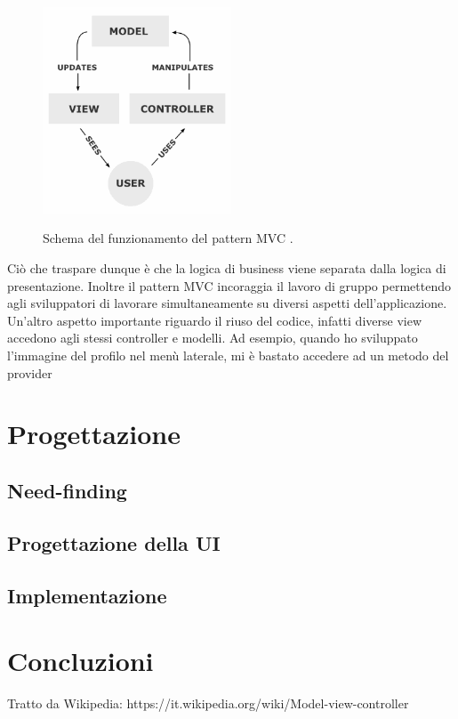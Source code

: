\documentclass[Lau, oneside]{sapthesis}%
\begin{document}
\begin{figure}[h]
	\caption{Schema del funzionamento del pattern MVC \cite{ref:mvc}.}
	\centering
	\includegraphics[width=0.5\textwidth]{MVC-Process}
	\label{fig:mvc}
\end{figure}

Ciò che traspare dunque è che la logica di business viene separata dalla logica di presentazione. Inoltre il pattern MVC incoraggia il 
lavoro di gruppo permettendo agli sviluppatori di lavorare simultaneamente su diversi aspetti dell'applicazione. Un'altro aspetto importante
riguardo il riuso del codice, infatti diverse view accedono agli stessi controller e modelli. Ad esempio, quando ho sviluppato l'immagine
del profilo nel menù laterale, mi è bastato accedere ad un metodo del provider %


\chapter{Progettazione}
\label{ch:3}

\section{Need-finding}
\label{sec:nf}

\section{Progettazione della UI}
\label{sec:ui}

\section{Implementazione}
\label{sec:dev}


\chapter{Concluzioni}
\label{ch:4}

\backmatter
{}
\begin{thebibliography}{17}

Tratto da Wikipedia:
https://it.wikipedia.org/wiki/Model-view-controller

\end{thebibliography}
\end{document}
